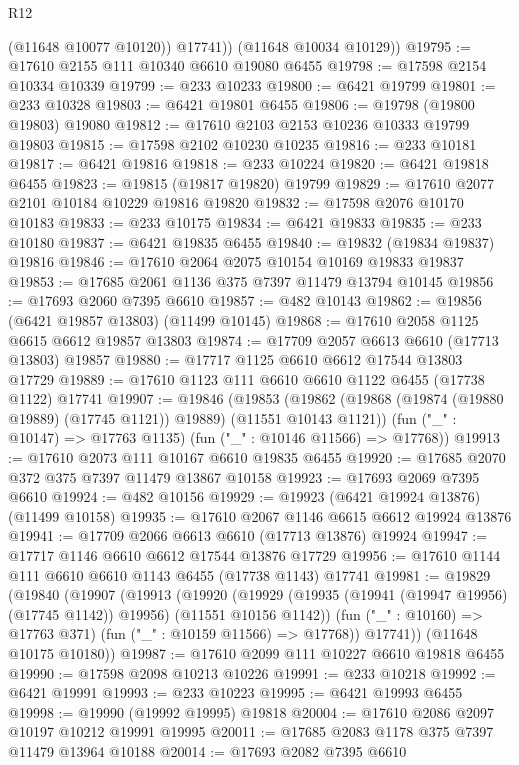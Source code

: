 \begin{lexlean}{R12}
\begin{coremodule}
{{{{{{{{{{{{{{{{{{{{{{{{{{{{{{{{{{{{{{{{{{{{{{{{{{{{{{{{{{{{{{{{{{{{{{{{{{{{{{{{{{            (@11648 @10077 @10120))
          @17741))
      (@11648 @10034 @10129))
@19795 := @17610 @2155 @111 @10340 @6610 @19080 @6455
@19798 := @17598 @2154 @10334 @10339
@19799 := @233 @10233
@19800 := @6421 @19799
@19801 := @233 @10328
@19803 := @6421 @19801 @6455
@19806 := @19798 (@19800 @19803) @19080
@19812 := @17610 @2103 @2153 @10236 @10333 @19799 @19803
@19815 := @17598 @2102 @10230 @10235
@19816 := @233 @10181
@19817 := @6421 @19816
@19818 := @233 @10224
@19820 := @6421 @19818 @6455
@19823 := @19815 (@19817 @19820) @19799
@19829 := @17610 @2077 @2101 @10184 @10229 @19816 @19820
@19832 := @17598 @2076 @10170 @10183
@19833 := @233 @10175
@19834 := @6421 @19833
@19835 := @233 @10180
@19837 := @6421 @19835 @6455
@19840 := @19832 (@19834 @19837) @19816
@19846 := @17610 @2064 @2075 @10154 @10169 @19833 @19837
@19853 := @17685 @2061 @1136 @375 @7397 @11479 @13794 @10145
@19856 := @17693 @2060 @7395 @6610
@19857 := @482 @10143
@19862 := @19856 (@6421 @19857 @13803) (@11499 @10145)
@19868 := @17610 @2058 @1125 @6615 @6612 @19857 @13803
@19874 := @17709 @2057 @6613 @6610 (@17713 @13803) @19857
@19880 := @17717 @1125 @6610 @6612 @17544 @13803 @17729
@19889 := @17610 @1123 @111 @6610 @6610 @1122 @6455 (@17738 @1122) @17741
@19907 := @19846
    (@19853
      (@19862 (@19868 (@19874 (@19880 @19889) (@17745 @1121)) @19889) (@11551 @10143 @1121))
      (fun ("_" : @10147) => @17763 @1135)
      (fun ("_" : @10146 @11566) => @17768))
@19913 := @17610 @2073 @111 @10167 @6610 @19835 @6455
@19920 := @17685 @2070 @372 @375 @7397 @11479 @13867 @10158
@19923 := @17693 @2069 @7395 @6610
@19924 := @482 @10156
@19929 := @19923 (@6421 @19924 @13876) (@11499 @10158)
@19935 := @17610 @2067 @1146 @6615 @6612 @19924 @13876
@19941 := @17709 @2066 @6613 @6610 (@17713 @13876) @19924
@19947 := @17717 @1146 @6610 @6612 @17544 @13876 @17729
@19956 := @17610 @1144 @111 @6610 @6610 @1143 @6455 (@17738 @1143) @17741
@19981 := @19829
    (@19840
      (@19907
        (@19913
          (@19920
            (@19929 (@19935 (@19941 (@19947 @19956) (@17745 @1142)) @19956) (@11551 @10156 @1142))
            (fun ("_" : @10160) => @17763 @371)
            (fun ("_" : @10159 @11566) => @17768))
          @17741))
      (@11648 @10175 @10180))
@19987 := @17610 @2099 @111 @10227 @6610 @19818 @6455
@19990 := @17598 @2098 @10213 @10226
@19991 := @233 @10218
@19992 := @6421 @19991
@19993 := @233 @10223
@19995 := @6421 @19993 @6455
@19998 := @19990 (@19992 @19995) @19818
@20004 := @17610 @2086 @2097 @10197 @10212 @19991 @19995
@20011 := @17685 @2083 @1178 @375 @7397 @11479 @13964 @10188
@20014 := @17693 @2082 @7395 @6610
}}}}}}}}}}}}}}}}}}}}}}}}}}}}}}}}}}}}}}}}}}}}}}}}}}}}}}}}}}}}}}}}}}}}}}}}}}}}}}}}}}
\end{coremodule}
\end{lexlean}
